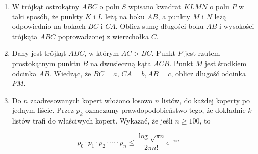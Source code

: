 \documentclass[10pt]{article}
\begin{document}
\begin{enumerate}
  \item W trójkąt ostrokątny \(A B C\) o polu \(S\) wpisano kwadrat \(K L M N\) o polu \(P\) w taki sposób, że punkty \(K\) i \(L\) leżą na boku \(A B\), a punkty \(M\) i \(N\) leżą odpowiednio na bokach \(B C\) i \(C A\). Oblicz sumę długości boku \(A B\) i wysokości trójkąta \(A B C\) poprowadzonej z wierzchołka \(C\).
  \item Dany jest trójkąt \(A B C\), w którym \(A C>B C\). Punkt \(P\) jest rzutem prostokątnym punktu \(B\) na dwusieczną kąta \(A C B\). Punkt \(M\) jest środkiem odcinka \(A B\). Wiedząc, że \(B C=a\), \(C A=b, A B=c\), oblicz długość odcinka \(P M\).
  \item Do \(n\) zaadresowanych kopert włożono losowo \(n\) listów, do każdej koperty po jednym liście. Przez \(p_{k}\) oznaczamy prawdopodobieństwo tego, że dokładnie \(k\) listów trafi do właściwych kopert. Wykazać, że jeśli \(n \geq 100\), to
\end{enumerate}

\[
p_{0} \cdot p_{1} \cdot p_{2} \cdot \cdots \cdot p_{n} \leq \frac{\log \sqrt{\pi n}}{2 \pi n!} e^{-\pi n}
\]
\end{document}
